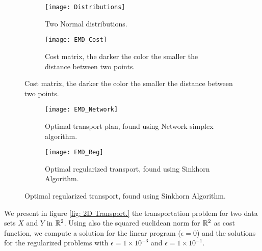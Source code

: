 \begin{figure}[H]
	\begin{center}
		\caption{Numerical examples, $c(x,y)=\frac{1}{2}\abs{x-y}^2$.}
		
		\begin{subfigure}[t]{0.45\textwidth}
			\caption{Two Normal distributions.}
			\texttt{[image: Distributions]}
		\end{subfigure}
		\begin{subfigure}[t]{0.45\textwidth}
			\caption{Cost matrix, the darker the color the smaller the distance between two points. }
			\texttt{[image: EMD\_Cost]}
		\end{subfigure}
				\end{center}
		\end{figure}
\begin{figure}[H]
	\begin{center}
\caption{Optimal couplings for two Gaussians.}
		\begin{subfigure}[b]{0.45\textwidth}
			\caption{Optimal transport plan, found using Network simplex algorithm.}
			\texttt{[image: EMD\_Network]}
			\label{fig: EMD Gaussians.}
		\end{subfigure}
		\begin{subfigure}[b]{0.45\textwidth}
			\caption{Optimal regularized transport, found using Sinkhorn Algorithm.}
			\texttt{[image: EMD\_Reg]}
			\label{fig: Sinkhorn Gaussians}
		\end{subfigure}
	\end{center}
\end{figure}

We present in figure \ref{fig: 2D Transport.} the transportation problem for two data sets $X$ and $Y$ in $\mathbb{R}^2$. Using also the squared euclidean norm for $\mathbb{R}^2$ as cost function, we compute a solution for the linear program ($\epsilon=0$) and the solutions for the regularized problems with $\epsilon= 1\times 10^{-3}$ and $\epsilon=1\times 10^{-1}$.

